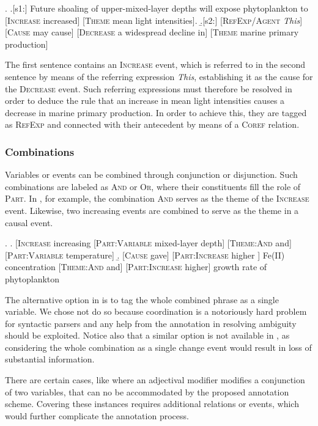 \documentclass[10pt, a4paper]{article}
\newcommand{\tag}[1]{\textsc{#1}}
\begin{document}
\exi. 
  \a.[s1:] Future shoaling of upper-mixed-layer depths will expose phytoplankton to [\tag{Increase} increased] [\tag{Theme} mean light intensities].
  \b.[s2:] [\tag{RefExp/Agent} \emph{This}] [\tag{Cause} may cause] [\tag{Decrease} a widespread decline in] [\tag{Theme} marine primary production]

The first sentence contains an \tag{Increase} event, which is referred to in the second sentence by means of the referring expression \emph{This}, establishing it as the cause for the \tag{Decrease} event.
Such referring expressions must therefore be resolved in order to deduce the rule that an increase in mean light intensities causes a decrease in marine primary production.
In order to achieve this, they are tagged as \tag{RefExp} and connected with their antecedent by means of a \tag{Coref} relation. 
  

\subsubsection{Combinations}

Variables or events can be combined through conjunction or disjunction.
Such combinations are labeled as \tag{And} or \tag{Or}, where their constituents fill the role of \tag{Part}.
In \Next[a], for example, the combination \tag{And} serves as the theme of the \tag{Increase} event.
Likewise, two increasing events are combined to serve as the theme in a causal event.

\exi.
  \a. [\tag{Increase} increasing [\tag{Part:Variable} mixed-layer depth] [\tag{Theme:And} and] [\tag{Part:Variable} temperature]  
  \b. [\tag{Cause} gave] [\tag{Part:Increase} higher ] Fe(II) concentration [\tag{Theme:And} and] [\tag{Part:Increase} higher] growth rate of phytoplankton

The alternative option in \Last[a] is to tag the whole combined phrase as a single variable.
We chose not do so because coordination is a notoriously hard problem for syntactic parsers and any help from the annotation in resolving ambiguity should be exploited.
Notice also that a similar option is not available in \Last[b], as considering the whole combination as a single change event would result in loss of substantial information.

There are certain cases, like where an adjectival modifier modifies a conjunction of two variables, that can no be accommodated by the proposed annotation scheme.
Covering these instances requires additional relations or events, which would further complicate the annotation process. 
\end{document}
